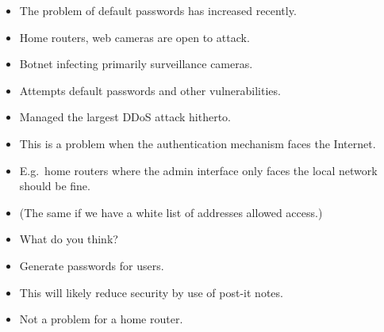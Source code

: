 \begin{frame}
  \begin{remark}
    \begin{itemize}
      \item The problem of default passwords has increased recently.
      \item Home routers, web cameras are open to attack.
    \end{itemize}
  \end{remark}

  \pause{}

  \begin{example}
    \begin{itemize}
      \item Botnet infecting primarily surveillance cameras.
      \item Attempts default passwords and other vulnerabilities.
      \item Managed the largest \ac{DDoS} attack hitherto.
    \end{itemize}
  \end{example}
\end{frame}

\begin{frame}
  \begin{exercise}
    \begin{itemize}
      \item This is a problem when the authentication mechanism faces the 
        Internet.

      \item E.g.\ home routers where the admin interface only faces the local 
        network should be fine.

      \item (The same if we have a white list of addresses allowed access.)

      \item What do you think?
    \end{itemize}
  \end{exercise}
\end{frame}

\begin{frame}
  \begin{example}
    \begin{itemize}
      \item Generate passwords for users.
      \item This will likely reduce security by use of post-it notes.
      \item Not a problem for a home router.
    \end{itemize}
  \end{example}
\end{frame}

